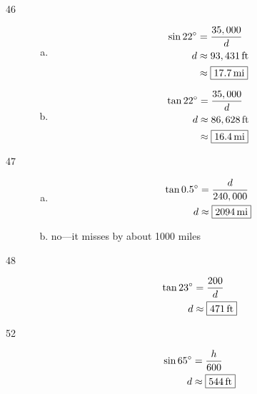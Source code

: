 \documentclass{exam}
\newcommand{\dg}{\ensuremath{^\circ}}
\begin{document}
\begin{description}
      \item[46]
        \begin{enumerate}[(a)]
          \item 
            \begin{align*}
              \sin 22 \dg & = \frac{35,000}{d} \\
              d           & \approx \unit[93,431]{ft} \\
                          & \approx \boxed{ \unit[17.7]{mi} } \\
            \end{align*}

          \item 
            \begin{align*}
              \tan 22 \dg & = \frac{35,000}{d} \\
              d           & \approx \unit[86,628]{ft} \\
                          & \approx \boxed{ \unit[16.4]{mi} } \\
            \end{align*}

        \end{enumerate}

      \pagebreak

      \item[47]
        \begin{enumerate}[(a)]
          \item 
            \begin{align*}
              \tan 0.5 \dg & = \frac{d}{240,000} \\
              d           & \approx \boxed{ \unit[2094]{mi} } \\
            \end{align*}

          \item 
            no---it misses by about 1000 miles
        \end{enumerate}

      \item[48]
        \begin{align*}
          \tan 23 \dg & = \frac{200}{d} \\
          d           & \approx \boxed{ \unit[471]{ft} } \\
        \end{align*}

      \item[52]
        \begin{align*}
          \sin 65 \dg & = \frac{h}{600} \\
          d           & \approx \boxed{ \unit[544]{ft} } \\
        \end{align*}


\end{description}
\end{document}
